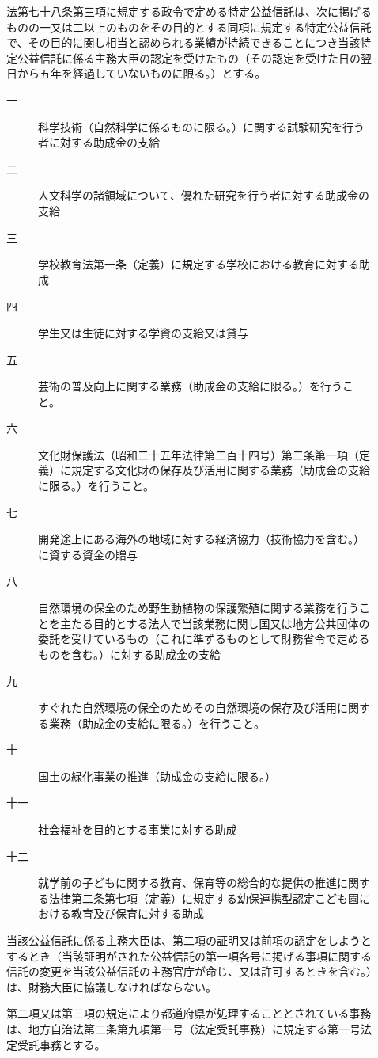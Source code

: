 \documentclass[twocolumn,a4j,10pt]{ltjtarticle}
\begin{document}
\begin{description}
\item[]法第七十八条第三項に規定する政令で定める特定公益信託は、次に掲げるものの一又は二以上のものをその目的とする同項に規定する特定公益信託で、その目的に関し相当と認められる業績が持続できることにつき当該特定公益信託に係る主務大臣の認定を受けたもの（その認定を受けた日の翌日から五年を経過していないものに限る。）とする。
\begin{description}
\item[一]科学技術（自然科学に係るものに限る。）に関する試験研究を行う者に対する助成金の支給
\item[二]人文科学の諸領域について、優れた研究を行う者に対する助成金の支給
\item[三]学校教育法第一条（定義）に規定する学校における教育に対する助成
\item[四]学生又は生徒に対する学資の支給又は貸与
\item[五]芸術の普及向上に関する業務（助成金の支給に限る。）を行うこと。
\item[六]文化財保護法（昭和二十五年法律第二百十四号）第二条第一項（定義）に規定する文化財の保存及び活用に関する業務（助成金の支給に限る。）を行うこと。
\item[七]開発途上にある海外の地域に対する経済協力（技術協力を含む。）に資する資金の贈与
\item[八]自然環境の保全のため野生動植物の保護繁殖に関する業務を行うことを主たる目的とする法人で当該業務に関し国又は地方公共団体の委託を受けているもの（これに準ずるものとして財務省令で定めるものを含む。）に対する助成金の支給
\item[九]すぐれた自然環境の保全のためその自然環境の保存及び活用に関する業務（助成金の支給に限る。）を行うこと。
\item[十]国土の緑化事業の推進（助成金の支給に限る。）
\item[十一]社会福祉を目的とする事業に対する助成
\item[十二]就学前の子どもに関する教育、保育等の総合的な提供の推進に関する法律第二条第七項（定義）に規定する幼保連携型認定こども園における教育及び保育に対する助成
\end{description}
\item[]当該公益信託に係る主務大臣は、第二項の証明又は前項の認定をしようとするとき（当該証明がされた公益信託の第一項各号に掲げる事項に関する信託の変更を当該公益信託の主務官庁が命じ、又は許可するときを含む。）は、財務大臣に協議しなければならない。
\item[]第二項又は第三項の規定により都道府県が処理することとされている事務は、地方自治法第二条第九項第一号（法定受託事務）に規定する第一号法定受託事務とする。
\end{description}
\end{document}
